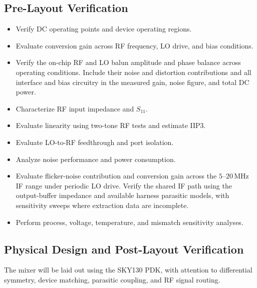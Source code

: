 \documentclass[11pt,letterpaper]{article}
\begin{document}
\subsection{Pre-Layout Verification}

\begin{itemize}
    \item Verify DC operating points and device operating regions.

    \item Evaluate conversion gain across RF frequency, LO drive, and bias conditions.

    \item Verify the on-chip RF and LO balun amplitude and phase balance across operating conditions.
    Include their noise and distortion contributions and all interface and bias circuitry in the measured gain, noise figure, and total DC power.

    \item Characterize RF input impedance and \(S_{11}\).

    \item Evaluate linearity using two-tone RF tests and estimate IIP3.

    \item Evaluate LO-to-RF feedthrough and port isolation.

    \item Analyze noise performance and power consumption.

    \item Evaluate flicker-noise contribution and conversion gain across the \(5\)--\(20\,\mathrm{MHz}\) IF range under periodic LO drive.
    Verify the shared IF path using the output-buffer impedance and available harness parasitic models, with sensitivity sweeps where extraction data are incomplete.

    \item Perform process, voltage, temperature, and mismatch sensitivity analyses.
\end{itemize}


\subsection{Physical Design and Post-Layout Verification}

The mixer will be laid out using the SKY130 PDK, with attention to differential symmetry, device matching, parasitic coupling, and RF signal routing.
\end{document}
